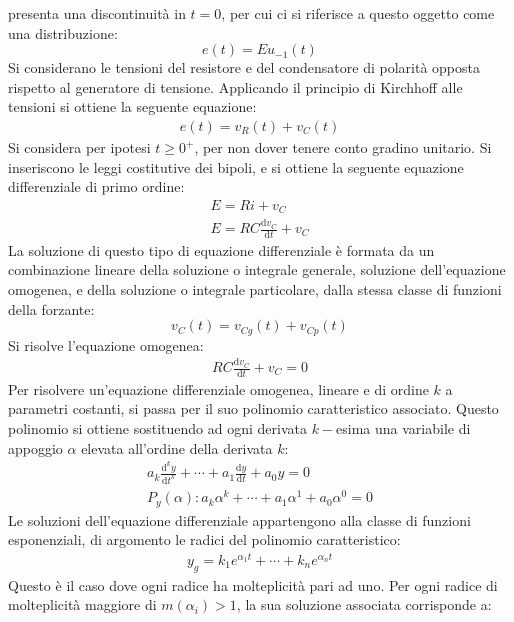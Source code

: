 \documentclass{article}
\newcommand{\df}{\mathrm{d}}
\numberwithin{equation}{subsection}
\begin{document}
presenta una discontinuità in $t=0$, per cui ci si riferisce a questo oggetto come una distribuzione:
\begin{equation*}
    e(t)=Eu_{-1}(t)
\end{equation*} Si considerano le tensioni del resistore e del condensatore di polarità 
opposta rispetto al generatore di tensione. Applicando il principio di Kirchhoff alle tensioni si ottiene la seguente equazione:
\begin{gather*}
    e(t)=v_R(t)+v_C(t)
\end{gather*}
Si considera per ipotesi $t\geq0^+$, per non dover tenere conto gradino unitario. Si inseriscono le leggi costitutive dei bipoli, e si ottiene la seguente equazione 
differenziale di primo ordine:
\begin{gather*}
    E=Ri+v_C\\
    E=RC\displaystyle\frac{\df v_C}{\df t}+v_C
\end{gather*}
La soluzione di questo tipo di equazione differenziale è formata da un combinazione lineare della soluzione o integrale generale, soluzione dell'equazione omogenea, e 
della soluzione o integrale particolare, dalla stessa classe di funzioni della forzante:
\begin{equation*}
    v_C(t)=v_{Cg}(t)+v_{Cp}(t)
\end{equation*}
Si risolve l'equazione omogenea:
\begin{gather*}
    RC\displaystyle\frac{\df v_C}{\df t}+v_C=0
\end{gather*}
Per risolvere un'equazione differenziale omogenea, lineare e di ordine $k$ a parametri costanti, si passa per il suo polinomio caratteristico associato. Questo polinomio 
si ottiene sostituendo ad ogni derivata $k-$esima una variabile di appoggio $\alpha$ elevata all'ordine della derivata $k$:
\begin{gather*}
    \displaystyle a_k\frac{\df^ky}{\df t^k}+\cdots+a_1\frac{\df  y}{\df t}+a_0y=0\\
    P_y(\alpha):a_k\alpha^k+\cdots+a_1\alpha^1+a_0\alpha^0=0
\end{gather*}
Le soluzioni dell'equazione differenziale appartengono alla classe di funzioni esponenziali, di argomento le radici del polinomio caratteristico:
\begin{gather*}
    y_g=k_1e^{\alpha_1t}+\cdots+k_ne^{\alpha_nt}
\end{gather*}
Questo è il caso dove ogni radice ha molteplicità pari ad uno. Per ogni radice di molteplicità maggiore di $m(\alpha_i)>1$, la sua soluzione associata corrisponde a:
\end{document}

